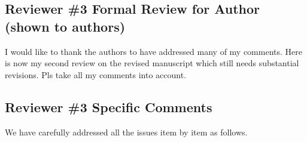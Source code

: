 \documentclass{reviewresponse}
\begin{document}
  \subsection*{Reviewer \#3 Formal Review for Author (shown to authors)}
  \begin{generalcomment}

    I would like to thank the authors to have addressed many of my comments. Here is now
    my second review on the revised manuscript which still needs substantial revisions.
    Pls take all my comments into account.
  \end{generalcomment}

  \subsection*{Reviewer \#3 Specific Comments}
  \begin{revresponse}
    We have carefully addressed all the issues item by item as follows.
  \end{revresponse}
\end{document}
